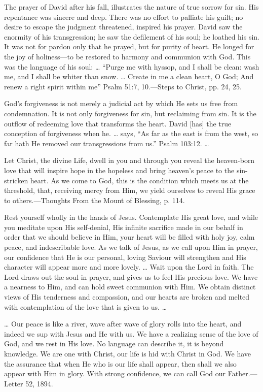 \documentclass[a4paper, 10pt, twoside, headings=small]{scrartcl}
\begin{document}
\begin{multicols}{2}
The prayer of David after his fall, illustrates the nature of true sorrow for sin. His repentance was sincere and deep. There was no effort to palliate his guilt; no desire to escape the judgment threatened, inspired his prayer. David saw the enormity of his transgression; he saw the defilement of his soul; he loathed his sin. It was not for pardon only that he prayed, but for purity of heart. He longed for the joy of holiness—to be restored to harmony and communion with God. This was the language of his soul: … “Purge me with hyssop, and I shall be clean: wash me, and I shall be whiter than snow. … Create in me a clean heart, O God; And renew a right spirit within me” Psalm 51:7, 10.—Steps to Christ, pp. 24, 25.

God’s forgiveness is not merely a judicial act by which He sets us free from condemnation. It is not only forgiveness for sin, but reclaiming from sin. It is the outflow of redeeming love that transforms the heart. David [has] the true conception of forgiveness when he. … says, “As far as the east is from the west, so far hath He removed our transgressions from us.” Psalm 103:12. …

Let Christ, the divine Life, dwell in you and through you reveal the heaven-born love that will inspire hope in the hopeless and bring heaven’s peace to the sin-stricken heart. As we come to God, this is the condition which meets us at the threshold, that, receiving mercy from Him, we yield ourselves to reveal His grace to others.—Thoughts From the Mount of Blessing, p. 114.

Rest yourself wholly in the hands of Jesus. Contemplate His great love, and while you meditate upon His self-denial, His infinite sacrifice made in our behalf in order that we should believe in Him, your heart will be filled with holy joy, calm peace, and indescribable love. As we talk of Jesus, as we call upon Him in prayer, our confidence that He is our personal, loving Saviour will strengthen and His character will appear more and more lovely. … Wait upon the Lord in faith. The Lord draws out the soul in prayer, and gives us to feel His precious love. We have a nearness to Him, and can hold sweet communion with Him. We obtain distinct views of His tenderness and compassion, and our hearts are broken and melted with contemplation of the love that is given to us. …

… Our peace is like a river, wave after wave of glory rolls into the heart, and indeed we sup with Jesus and He with us. We have a realizing sense of the love of God, and we rest in His love. No language can describe it, it is beyond knowledge. We are one with Christ, our life is hid with Christ in God. We have the assurance that when He who is our life shall appear, then shall we also appear with Him in glory. With strong confidence, we can call God our Father.—Letter 52, 1894.


\end{multicols}
\end{document}

